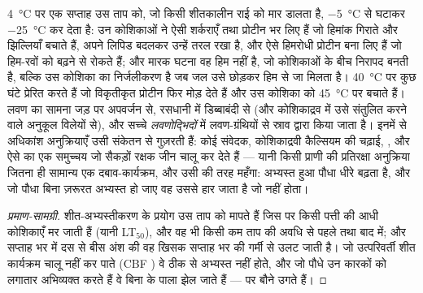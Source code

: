 \begin{proposition}[दबाव से अभ्यस्तीकरण]\label{prop:b2:plant-plasticity:stress}
\qty{4}{\celsius} पर एक सप्ताह उस ताप को, जो किसी शीतकालीन राई को
मार डालता है, \qty{-5}{\celsius} से घटाकर \qty{-25}{\celsius} कर देता
है: उन कोशिकाओं ने ऐसी शर्कराएँ तथा प्रोटीन भर लिए हैं जो हिमांक गिराते
और झिल्लियाँ बचाते हैं, अपने लिपिड बदलकर उन्हें तरल रखा है, और ऐसे
हिमरोधी प्रोटीन बना लिए हैं जो हिम-रवों को बढ़ने से रोकते हैं; और मारक
घटना वह हिम नहीं है, जो कोशिकाओं के बीच निरापद बनती है, बल्कि उस कोशिका
का निर्जलीकरण है जब जल उसे छोड़कर हिम से जा मिलता है। \qty{40}{\celsius} पर कुछ
घंटे \emph{} प्रेरित करते हैं जो
विकृतीकृत प्रोटीन फिर मोड़ देते हैं और उस कोशिका को
\qty{45}{\celsius} पर बचाते हैं। लवण का सामना जड़ पर अपवर्जन से,
रसधानी में डिब्बाबंदी से (और कोशिकाद्रव में उसे संतुलित करने वाले
अनुकूल विलेयों से), और सच्चे \emph{लवणोद्भिदों} में लवण-ग्रंथियों से
स्राव द्वारा किया जाता है। इनमें से अधिकांश अनुक्रियाएँ उसी
संकेतन से गुज़रती हैं: कोई संवेदक, कोशिकाद्रवी कैल्सियम की चढ़ाई,
, और ऐसे  का एक समुच्चय जो सैकड़ों
रक्षक जीन चालू कर देते हैं --- यानी किसी प्राणी की प्रतिरक्षा अनुक्रिया
जितना ही सामान्य एक दबाव-कार्यक्रम, और उसी की तरह महँगा: अभ्यस्त हुआ
पौधा धीरे बढ़ता है, और जो पौधा बिना ज़रूरत अभ्यस्त हो जाए वह उससे हार
जाता है जो नहीं होता।
\end{proposition}
\begin{proof}[प्रमाण-सामग्री]
शीत-अभ्यस्तीकरण के प्रयोग उस ताप को मापते हैं जिस पर किसी पत्ती की
आधी कोशिकाएँ मर जाती हैं (यानी LT$_{50}$), और वह भी किसी कम ताप की
अवधि से पहले तथा बाद में; और सप्ताह भर में दस से बीस अंश की वह खिसक
सप्ताह भर की गर्मी से उलट जाती है। जो उत्परिवर्ती शीत
कार्यक्रम चालू नहीं कर पाते (CBF ) वे ठीक से अभ्यस्त नहीं
होते, और जो पौधे उन कारकों को लगातार अभिव्यक्त करते हैं वे बिना
 के पाला झेल जाते हैं --- पर बौने उगते हैं।
\end{proof}

